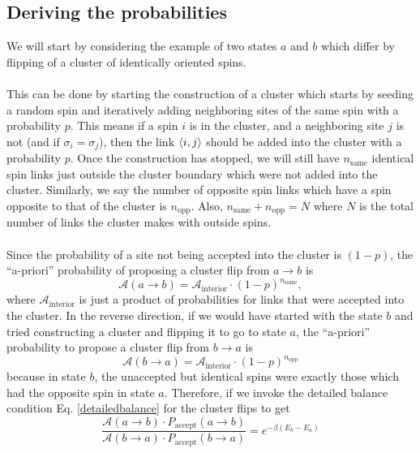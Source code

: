 \documentclass[../thesis_main.tex]{subfiles}
\begin{document}
\subsection{Deriving the probabilities}
We will start by considering the example of two states $a$ and $b$ which differ by flipping of a cluster of identically oriented spins.~\\~\\
This can be done by starting the construction of a cluster which starts by seeding a random spin and iteratively adding neighboring sites of the same spin with a probability $p$. This means if a spin $i$ is in the cluster, and a neighboring site $j$ is not (and if $\sigma_i = \sigma_j$), then the link $\expval{i,j}$ should be added into the cluster with a probability $p$. Once the construction has stopped, we will still have $n_\text{same}$ identical spin links just outside the cluster boundary which were not added into the cluster. Similarly, we say the number of opposite spin links which have a spin opposite to that of the cluster is $n_\text{opp}$. Also, $n_\text{same} + n_\text{opp} = N$ where $N$ is the total number of links the cluster makes with outside spins.~\\~\\  
Since the probability of a site not being accepted into the cluster is $(1-p)$, the ``a-priori'' probability of proposing a cluster flip from $a \to b$ is 
\begin{equation}
    \mathcal{A}(a \to b) = \mathcal{A}_\text{interior} \cdot (1-p)^{n_\text{same}},
\end{equation}
where $\mathcal{A}_\text{interior}$ is just a product of probabilities for links that were accepted into the cluster. In the reverse direction, if we would have started with the state $b$ and tried constructing a cluster and flipping it to go to state $a$, the ``a-priori'' probability to propose a cluster flip from $b \to a$ is 
\begin{equation}
    \mathcal{A}(b \to a) = \mathcal{A}_\text{interior} \cdot (1-p)^{n_\text{opp}}
\end{equation}
because in state $b$, the unaccepted but identical spins were exactly those which had the opposite spin in state $a$. Therefore, if we invoke the detailed balance condition Eq. \eqref{detailedbalance} for the cluster flips to get
\begin{equation}
    \frac{\mathcal{A}(a \to b) \cdot P_\text{accept}(a \to b)}{\mathcal{A}(b \to a) \cdot P_\text{accept}(b \to a)} = e^{-\beta(E_b - E_a)}
\end{equation}
\end{document}
